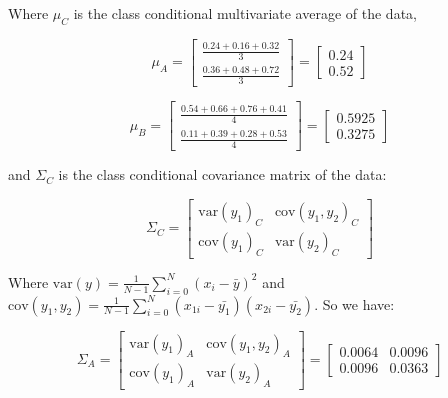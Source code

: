 \documentclass[12pt]{article}
\begin{document}
\begin{enumerate}[leftmargin=\labelsep]
\begin{enumerate}
        Where $\mu_C$ is the class conditional multivariate average of the data,

        \begin{equation}
        \mu_A = \begin{bmatrix}
            \frac{0.24 + 0.16 + 0.32}{3} \\
            \frac{0.36 + 0.48 + 0.72}{3}
        \end{bmatrix} = \begin{bmatrix}
            0.24 \\
            0.52
        \end{bmatrix}
        \end{equation}

        \begin{equation}
            \mu_B =
            \begin{bmatrix}
                \frac{0.54 + 0.66 + 0.76 + 0.41}{4} \\
                \frac{0.11 + 0.39 + 0.28 + 0.53}{4}
            \end{bmatrix} =
            \begin{bmatrix}
                0.5925 \\
                0.3275
            \end{bmatrix}
        \end{equation}

        and $\Sigma_C$ is the class conditional covariance matrix of the data:

        \begin{equation}
            \Sigma_C =
            \begin{bmatrix}
                \textrm{var}(y_1)_C & \textrm{cov}(y_1, y_2)_C \\
                \textrm{cov}(y_1)_C & \textrm{var}(y_2)_C
            \end{bmatrix} 
        \end{equation}

        Where $\textrm{var}(y) = \frac{1}{N-1}\sum_{i = 0}^{N}(x_i - \bar{y})^2$ and $\textrm{cov}(y_1, y_2) = \frac{1}{N-1}\sum_{i = 0}^{N}(x_{1i} - \bar{y_1})(x_{2i} - \bar{y_2})$.
        So we have:

        \begin{equation}
            \Sigma_A =
            \begin{bmatrix}
                \textrm{var}(y_1)_A & \textrm{cov}(y_1, y_2)_A \\
                \textrm{cov}(y_1)_A & \textrm{var}(y_2)_A
            \end{bmatrix}=
            \begin{bmatrix}
                0.0064 & 0.0096 \\
                0.0096 & 0.0363
            \end{bmatrix}
        \end{equation}


\end{enumerate}
\end{enumerate}
\end{document}
